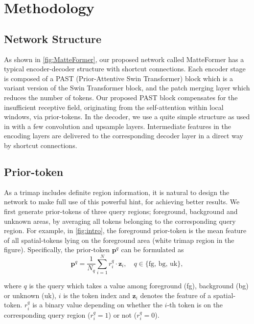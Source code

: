 \documentclass[10pt,twocolumn,letterpaper]{article}
\begin{document}
\section{Methodology}
\subsection{Network Structure}
\label{sec:structure}
As shown in \cref{fig:MatteFormer}, our proposed network called MatteFormer has a typical encoder-decoder structure with shortcut connections. Each encoder stage is composed of a PAST (Prior-Attentive Swin Transformer) block which is a variant version of the Swin Transformer block, and the patch merging layer which reduces the number of tokens. Our proposed PAST block compensates for the insufficient receptive field, originating from the self-attention within local windows, via prior-tokens. In the decoder, we use a quite simple structure as used in\cite{yu2021mask} with a few convolution and upsample layers. Intermediate features in the encoding layers are delivered to the corresponding decoder layer in a direct way by shortcut connections.

\subsection{Prior-token}
\label{sec:prior-token}
As a trimap includes definite region information, it is natural to design the network to make full use of this powerful hint, for achieving better results. We first generate prior-tokens of three query regions; foreground, background and unknown areas, by averaging all tokens belonging to the corresponding query region. For example, in \cref{fig:intro}, the foreground prior-token is the mean feature of all spatial-tokens lying on the foreground area (white trimap region in the figure).
Specifically, the prior-token $\mathbf{p}^q$ can be formulated as
\begin{equation}
  \mathbf{p}^q = \frac{1}{N_{q}}\sum ^{N}_{i=1} r^{q}_{i} \cdot \mathbf{z}_i, \quad q \in \{ \text{fg, bg, uk} \}, 
  \label{eq:prior}
\end{equation}

where $q$ is the query which takes a value among foreground (fg), background (bg) or unknown (uk), $i$ is the token index and $\mathbf{z}_i$ denotes the feature of a spatial-token. $r_{i}^{q}$ is a binary value depending on whether the $i$-th token is on the corresponding query region ($r_i^q = 1$) or not ($r_i^q = 0$). 
\end{document}
